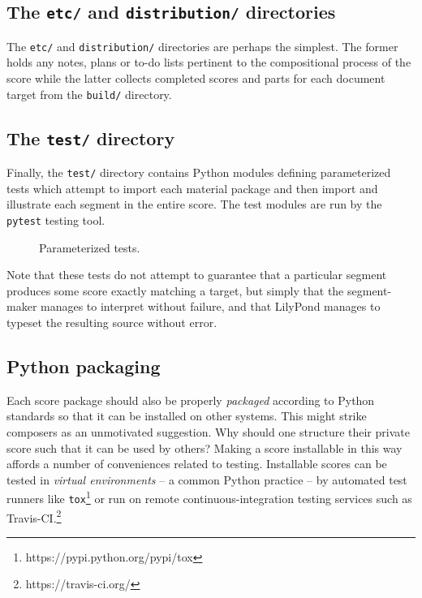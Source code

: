 \subsection{The \texttt{etc/} and \texttt{distribution/} directories}
\label{ssec:the-etc-and-distribution-directories}

The \texttt{etc/} and \texttt{distribution/} directories are perhaps the
simplest. The former holds any notes, plans or to-do lists pertinent to the
compositional process of the score while the latter collects completed scores
and parts for each document target from the \texttt{build/} directory.

\subsection{The \texttt{test/} directory}
\label{ssec:the-test-directory}

Finally, the \texttt{test/} directory contains Python modules defining
parameterized tests which attempt to import each material package and then
import and illustrate each segment in the entire score. The test modules are
run by the \texttt{pytest} testing tool.

\begin{figure}[h!]
\begin{singlespacing}
\vspace{-0.5\baselineskip}
\end{singlespacing}
\caption{Parameterized tests.}
\end{figure}

Note that these tests do not attempt to guarantee that a particular segment
produces some score exactly matching a target, but simply that the
segment-maker manages to interpret without failure, and that LilyPond manages
to typeset the resulting source without error.

\subsection{Python packaging}
\label{ssec:python-packaging}

Each score package should also be properly \emph{packaged} according to Python
standards so that it can be installed on other systems. This might strike
composers as an unmotivated suggestion. Why should one structure their private
score such that it can be used by others? Making a score installable in this
way affords a number of conveniences related to testing. Installable scores can
be tested in \emph{virtual environments} -- a common Python practice -- by
automated test runners like
\texttt{tox}\footnote{https://pypi.python.org/pypi/tox} or run on remote
continuous-integration testing services such as
Travis-CI.\footnote{https://travis-ci.org/}

